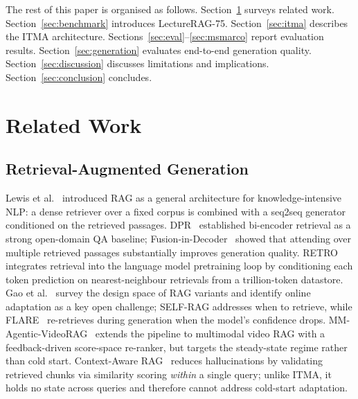 \documentclass[preprint,12pt]{elsarticle}
\begin{document}
The rest of this paper is organised as follows.  Section~\ref{sec:related}
surveys related work.  Section~\ref{sec:benchmark} introduces LectureRAG-75.
Section~\ref{sec:itma} describes the ITMA architecture.
Sections~\ref{sec:eval}--\ref{sec:msmarco} report evaluation results.
Section~\ref{sec:generation} evaluates end-to-end generation quality.
Section~\ref{sec:discussion} discusses limitations and implications.
Section~\ref{sec:conclusion} concludes.

\section{Related Work}
\label{sec:related}

\subsection{Retrieval-Augmented Generation}
Lewis et al.~\citep{lewis2020rag} introduced RAG as a general architecture
for knowledge-intensive NLP: a dense retriever over a fixed corpus is combined
with a seq2seq generator conditioned on the retrieved passages.
DPR~\citep{karpukhin2020dpr} established bi-encoder retrieval as a strong
open-domain QA baseline; Fusion-in-Decoder~\citep{izacard2021leveraging}
showed that attending over multiple retrieved passages substantially improves
generation quality.  RETRO~\citep{borgeaud2022retro} integrates retrieval into
the language model pretraining loop by conditioning each token prediction on
nearest-neighbour retrievals from a trillion-token datastore.  Gao et
al.~\citep{gao2024ragsurv} survey the design space of RAG variants and
identify online adaptation as a key open challenge; SELF-RAG
\citep{asai2024selfrag} addresses when to retrieve, while
FLARE~\citep{jiang2023active} re-retrieves during generation when the
model's confidence drops.  MM-Agentic-VideoRAG~\citep{swaroop2026mtap}
extends the pipeline to multimodal video RAG with a feedback-driven score-space
re-ranker, but targets the steady-state regime rather than cold start.
Context-Aware RAG~\citep{carag2025} reduces hallucinations by validating
retrieved chunks via similarity scoring \emph{within} a single query; unlike
ITMA, it holds no state across queries and therefore cannot address cold-start
adaptation.
\end{document}

